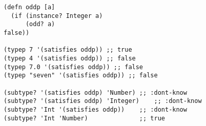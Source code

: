 \begin{lstlisting}[style=reclojureClojure]
(defn oddp [a]
  (if (instance? Integer a)
      (odd? a)
false))

(typep 7 '(satisfies oddp)) ;; true
(typep 4 '(satisfies oddp)) ;; false
(typep 7.0 '(satisfies oddp)) ;; false
(typep "seven" '(satisfies oddp)) ;; false

(subtype? '(satisfies oddp) 'Number) ;; :dont-know
(subtype? '(satisfies oddp) 'Integer)    ;; :dont-know
(subtype? 'Int '(satisfies oddp))    ;; :dont-know
(subtype? 'Int 'Number)              ;; true
\end{lstlisting}
